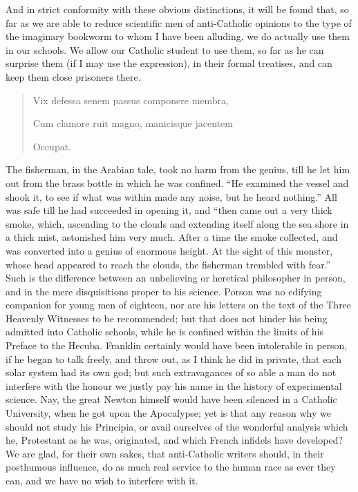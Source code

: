 And in strict conformity with these obvious distinctions, it will
be found that, so far as we are able to reduce scientific men of
anti-Catholic opinions to the type of the imaginary bookworm to whom I
have been alluding, we do actually use them in our schools. We allow
our Catholic student to use them, so far as he can surprise them (if I
may use the expression), in their formal treatises, and can keep them
close prisoners there.

\begin{quote}

Vix defessa senem passus componere membra,

Cum clamore ruit magno, manicisque jacentem

Occupat.

\end{quote}

The fisherman, in the Arabian tale, took no harm from the
genius, till he let him out from the brass bottle in which he was
confined. ``He examined the vessel and shook it, to see if what
was within made any noise, but he heard nothing.'' All was safe
till he had succeeded in opening it, and ``then came out a very
thick smoke, which, ascending to the clouds and extending itself along
the sea shore in a thick mist, astonished him very much. After a time
the smoke collected, and was converted into a genius of enormous
height. At the sight of this monster, whose head appeared to reach the
clouds, the fisherman trembled with fear.'' Such is the difference
between an unbelieving or heretical philosopher in person, and in the
mere disquisitions proper to his science. Porson was no edifying
companion for young men of eighteen, nor are his letters on the text
of the Three Heavenly Witnesses to be recommended; but that does not
hinder his being admitted into Catholic schools, while he is confined
within the limits of his Preface to the Hecuba. Franklin certainly
would have been intolerable in person, if he began to talk freely, and
throw out, as I think he did in private, that each solar system had
its own god; but such extravagances of so able a man do not interfere
with the honour we justly pay his name in the history of experimental
science. Nay, the great Newton himself would have been silenced in a
Catholic University, when he got upon the Apocalypse; yet is that any
reason why we should not study his Principia, or avail ourselves of
the wonderful analysis which he, Protestant as he was, originated, and
which French infidels have developed? We are glad, for their own
sakes, that anti-Catholic writers should, in their posthumous
influence, do as much real service to the human race as ever they can,
and we have no wish to interfere with it.

